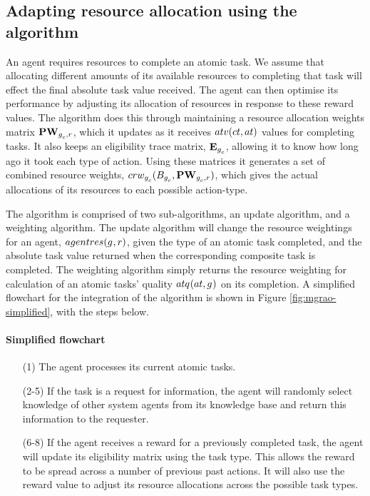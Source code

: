 \subsection{Adapting resource allocation using the \acronymMGRAO{}{} algorithm}
\label{section:solution_mgrao}

An agent requires resources to complete an atomic task. We assume that allocating different amounts of its available resources to completing that task will effect the final absolute task value received. The agent can then optimise its performance by adjusting its allocation of  resources in response to these reward values. The \acronymMGRAO{}{} algorithm does this through maintaining a resource allocation weights matrix $\matrixResourceWeight{}{}$, which it updates as it receives $\functionTaskAbsoluteValue{}{}$ values for completing tasks. It also keeps an eligibility trace matrix, $\matrixEligibilityTrace{}{}$, allowing it to know how long ago it took each type of action. Using these matrices it generates a set of combined resource weights, $\functionCombinedResourceWeightsSignature{}{}$, which gives the actual allocations of its resources to each possible action-type.

The algorithm is comprised of two sub-algorithms, an update algorithm, and a weighting algorithm. The update algorithm will change the resource weightings for an agent, $\functionAgentResources{}{}$, given the type of an atomic task completed, and the absolute task value returned when the corresponding composite task is completed. The weighting algorithm simply returns the resource weighting for calculation of an atomic tasks' quality $\functionAtomicTaskQualitySignature{}{}$ on its completion. A simplified flowchart for the integration of the \acronymMGRAO{}{} algorithm is shown in Figure \ref{fig:mgrao-simplified}, with the steps below.

 \paragraph*{Simplified \acronymMGRAO{}{} flowchart}
\begin{enumerate}

	\item[(1)] The agent processes its current atomic tasks. 
	\item[(2-5)] If the task is a request for information, the agent will randomly select knowledge of other system agents from its knowledge base and return this information to the requester. 
	\item[(6-8)] If the agent receives a reward for a previously completed task, the agent will update its eligibility matrix using the task type. This allows the reward  to be spread across a number of previous past actions. It will also use the reward value to adjust its resource allocations across the possible task types.  
\end{enumerate}

